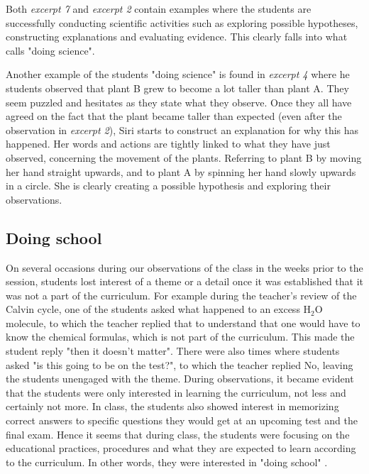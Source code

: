 Both \emph{excerpt 7} and \emph{excerpt 2} contain examples where the students are successfully conducting scientific activities such as exploring possible hypotheses, constructing explanations and evaluating evidence. This clearly falls into what \citet{jimenez2000doing} calls "doing science".

Another example of the students "doing science" is found in \emph{excerpt 4} where he students observed that plant B grew to become a lot taller than plant A. They seem puzzled and hesitates as they state what they observe. Once they all have agreed on the fact that the plant became taller than expected (even after the observation in \emph{excerpt 2}), Siri starts to construct an explanation for why this has happened. Her words and actions are tightly linked to what they have just observed, concerning the movement of the plants. Referring to plant B by moving her hand straight upwards, and to plant A by spinning her hand slowly upwards in a circle. She is clearly creating a possible hypothesis and exploring their observations. 

 


\subsection{Doing school}

On several occasions during our observations of the class in the weeks prior to the session, students lost interest of a theme or a detail once it was established that it was not a part of the curriculum. For example during the teacher's review of the Calvin cycle, one of the students asked what happened to an excess $\text{H}_2\text{O}$ molecule, to which the teacher replied that to understand that one would have to know the chemical formulas, which is not part of the curriculum. This made the student reply "then it doesn't matter". There were also times where students asked "is this going to be on the test?", to which the teacher replied No, leaving the students unengaged with the theme. During observations, it became evident that the students were only interested in learning the curriculum, not less and certainly not more. In class, the students also showed interest in memorizing correct answers to specific questions they would get at an upcoming test and the final exam. Hence it seems that during class, the students were focusing on the educational practices, procedures and what they are expected to learn according to the curriculum. In other words, they were interested in "doing school" \citep{jimenez2000doing}.


